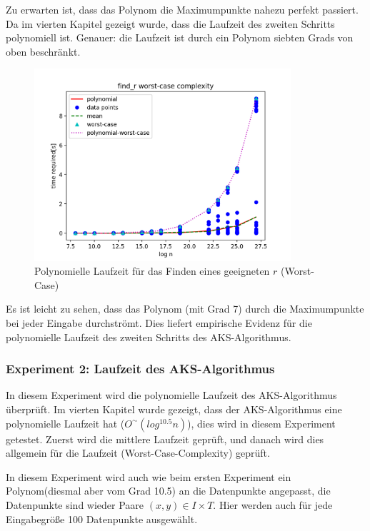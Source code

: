 \documentclass[12pt,oneside]{article}
\theoremstyle{remark}
\theoremstyle{definition}
\begin{document}
Zu erwarten ist, dass das Polynom die Maximumpunkte nahezu perfekt passiert. Da im vierten Kapitel gezeigt wurde, dass die Laufzeit des zweiten Schritts polynomiell ist. Genauer: die Laufzeit ist durch ein Polynom siebten Grads von oben beschränkt.\newline

\textbf{}\newline
\begin{figure}[h]
\includegraphics[width=9.5cm]{plots/find_r_worst_case.png}
\centering
\caption{Polynomielle Laufzeit für das Finden eines geeigneten $r$  (Worst-Case)}
\label{runtime-aks}
\end{figure}

Es ist leicht zu sehen, dass das Polynom (mit Grad 7) durch die Maximumpunkte bei jeder Eingabe durchströmt. Dies liefert empirische Evidenz für die polynomielle Laufzeit des zweiten Schritts des AKS-Algorithmus. 

\newpage

\subsubsection{Experiment 2: Laufzeit des AKS-Algorithmus}
In diesem Experiment wird die polynomielle Laufzeit des AKS-Algorithmus überprüft. Im vierten Kapitel wurde gezeigt, dass der AKS-Algorithmus eine polynomielle Laufzeit hat ($O^{\sim}(log^{10.5} n)$), dies wird in diesem Experiment getestet. Zuerst wird die mittlere Laufzeit geprüft, und danach wird dies allgemein für die Laufzeit (Worst-Case-Complexity) geprüft.\newline


In diesem Experiment wird auch wie beim ersten Experiment ein Polynom(diesmal aber vom Grad 10.5) an die Datenpunkte  angepasst, die Datenpunkte sind wieder Paare $(x,y) \in I \times T$. Hier werden auch für jede Eingabegröße 100 Datenpunkte ausgewählt.\newline 
\end{document}
